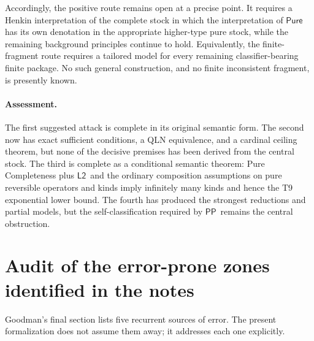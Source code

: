 \documentclass[12pt,leqno]{article}
\theoremstyle{plain}
\theoremstyle{definition}
\newcommand{\Pure}{\ensuremath{\mathsf{Pure}}}
\newcommand{\PP}{\ensuremath{\mathsf{PP}}}
\newcommand{\Ltwo}{\ensuremath{\mathsf{L2}}}
\begin{document}
Accordingly, the positive route remains open at a precise point.  It requires
a Henkin interpretation of the complete stock in which the interpretation of
\(\Pure\) has its own denotation in the appropriate higher-type pure stock,
while the remaining background principles continue to hold.  Equivalently,
the finite-fragment route requires a tailored model for every remaining
classifier-bearing finite package.  No such general construction, and no
finite inconsistent fragment, is presently known.

\paragraph{Assessment.}
The first suggested attack is complete in its original semantic form.  The
second now has exact sufficient conditions, a QLN equivalence, and a cardinal
ceiling theorem, but none of the decisive premises has been derived from the
central stock.  The third is complete as a conditional semantic theorem:
Pure Completeness plus \Ltwo\ and the ordinary composition assumptions on
pure reversible operators and kinds imply infinitely many kinds and hence
the T9 exponential lower bound.  The fourth
has produced the strongest reductions and partial models, but the
self-classification required by \PP\ remains the central obstruction.

\section{Audit of the error-prone zones identified in the notes}

Goodman's final section lists five recurrent sources of error.  The present
formalization does not assume them away; it addresses each one explicitly.
\end{document}
